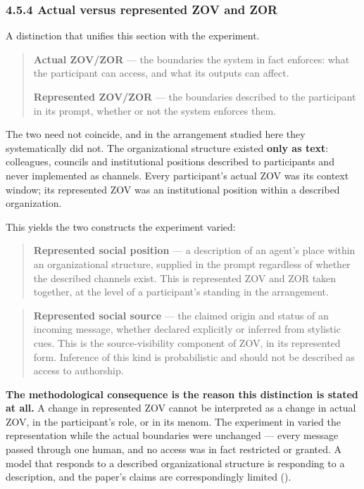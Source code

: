 \subsubsection*{4.5.4 Actual versus represented ZOV and ZOR}
\label{sec:en:4.5.4}

A distinction that unifies this section with the experiment.

\begin{quote}
\textbf{Actual ZOV/ZOR} — the boundaries the system in fact enforces: what the participant can access, and what its outputs can affect.

\textbf{Represented ZOV/ZOR} — the boundaries described to the participant in its prompt, whether or not the system enforces them.
\end{quote}
The two need not coincide, and in the arrangement studied here they systematically did not. The organizational structure existed \textbf{only as text}: colleagues, councils and institutional positions described to participants and never implemented as channels. Every participant's actual ZOV was its context window; its represented ZOV was an institutional position within a described organization.

This yields the two constructs the experiment varied:

\begin{quote}
\textbf{Represented social position} — a description of an agent's place within an organizational structure, supplied in the prompt regardless of whether the described channels exist. This is represented ZOV and ZOR taken together, at the level of a participant's standing in the arrangement.
\end{quote}
\begin{quote}
\textbf{Represented social source} — the claimed origin and status of an incoming message, whether declared explicitly or inferred from stylistic cues. This is the source-visibility component of ZOV, in its represented form. Inference of this kind is probabilistic and should not be described as access to authorship.
\end{quote}
\textbf{The methodological consequence is the reason this distinction is stated at all.} A change in represented ZOV cannot be interpreted as a change in actual ZOV, in the participant's role, or in its menom. The experiment in  varied the representation while the actual boundaries were unchanged — every message passed through one human, and no access was in fact restricted or granted. A model that responds to a described organizational structure is responding to a description, and the paper's claims are correspondingly limited ().

